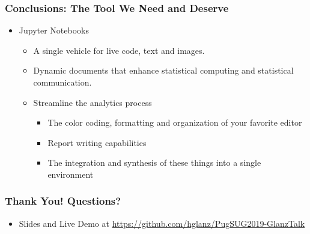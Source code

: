 \documentclass[xcolor={dvipsnames}]{beamer}
\newcommand{\ft}{\frametitle}
\newcommand{\bi}{\begin{itemize}}
\newcommand{\ei}{\end{itemize}}
\begin{document}
\begin{frame}
\ft{Conclusions: The Tool We Need and Deserve}
\bi
	\item Jupyter Notebooks
		\bi
			\item A single vehicle for live code, text and images.
			\item Dynamic documents that enhance statistical computing and statistical communication.
			\item Streamline the analytics process
				\bi
					\item The color coding, formatting and organization of your favorite editor
					\item Report writing capabilities
					\item The integration and synthesis of these things into a single environment
				\ei
		\ei
\ei
\end{frame}

\begin{frame}
\frametitle{Thank You! Questions?}
\bi
	\item Slides and Live Demo at \href{https://github.com/hglanz/PugSUG2019-GlanzTalk}{https://github.com/hglanz/PugSUG2019-GlanzTalk}
\ei
\end{frame}
\end{document}
